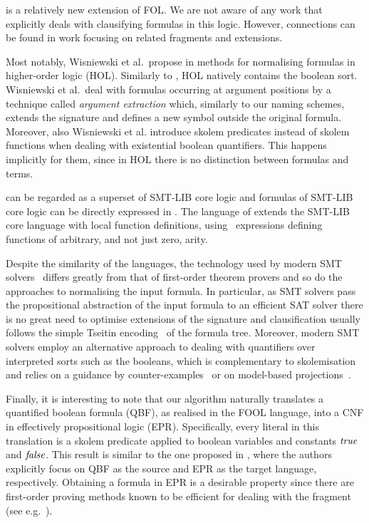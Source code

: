 \folb{} is a relatively new extension of FOL. We are not aware of any work that explicitly deals with clausifying formulas in this logic. However, connections can be found in work focusing on related fragments and extensions.

Most notably, Wisniewski et al.~propose in %
\cite{DBLP:conf/cade/WisniewskiSKB16}
methods for normalising formulas in higher-order logic (HOL). Similarly to \folb{},
HOL natively contains the boolean sort. Wisniewski et al.~deal with 
formulas occurring at argument positions by a technique called \emph{argument extraction} 
which, similarly to our naming schemes, extends the signature and defines a new symbol
outside the original formula. Moreover, also Wisniewski et al. introduce skolem predicates 
instead of skolem functions when dealing with existential boolean quantifiers. 
This happens implicitly for them, since in HOL there is no distinction between formulas and terms.

\folb{} can be regarded as a superset of SMT-LIB \cite{BarFT-SMTLIB} core logic and formulas of SMT-LIB core logic can be directly expressed in \folb{}. The language of \folb{} extends the SMT-LIB core language with local function definitions, using \LETIN\ expressions defining functions of arbitrary, and not just zero, arity. 

Despite the similarity of the languages, the technology used by modern SMT solvers~\cite{DBLP:journals/jacm/NieuwenhuisOT06}
differs greatly from that of %
first-order theorem provers and so do the approaches to normalising the input formula.
In particular, as SMT solvers pass the propositional abstraction of the input formula to an efficient SAT solver
there is no great need to optimise extensions of the signature 
and clausification usually follows the simple Tseitin encoding~\cite{tseitin_enc} of the formula tree.
%
Moreover, modern SMT solvers employ an alternative approach to dealing with quantifiers over interpreted sorts such as the booleans, 
which is complementary to skolemisation
and relies on a guidance by counter-examples~\cite{DBLP:journals/corr/Reynolds0K15} or on model-based projections~\cite{LPAR-20:Playing_with_Quantified_Satisfaction}.

Finally, it is interesting to note that our \nfcnf{} algorithm naturally translates a quantified boolean formula (QBF),
as realised in the FOOL language, into a CNF in effectively propositional logic (EPR).
Specifically, every literal in this translation is 
a skolem predicate applied to boolean variables and constants $\mathit{true}$ and $\mathit{false}$.
This result is similar to the one proposed in \cite{DBLP:conf/cade/SeidlLB12},
where the authors explicitly focus on QBF as the source and EPR as the target language, respectively.
Obtaining a formula in EPR is a desirable property %
since there are first-order proving methods 
known to be efficient for dealing with the fragment (see e.g.~\cite{DBLP:conf/birthday/Korovin13}).
